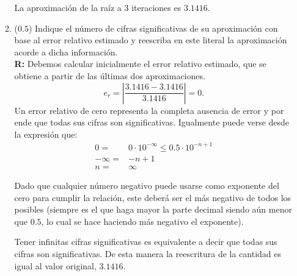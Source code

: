 \documentclass[12pt]{article}
\begin{document}
\begin{enumerate}[leftmargin=*,widest=9]
\begin{enumerate}[label=\alph*]
   La aproximación de la raíz a 3 iteraciones es \(3.1416\).

   \item (\(0.5\)) Indique el número de cifras significativas de su aproximación con base al error relativo estimado y reescriba en este literal la aproximación acorde a dicha información.\\
	 \textbf{R:} Debemos calcular inicialmente el error relativo estimado, que se obtiene a partir de las últimas dos aproximaciones.
	 \[ e_r = \left\vert \frac{3.1416 - 3.1416}{3.1416} \right\vert = 0. \]
	 Un error relativo de cero representa la completa ausencia de error y por ende que todas sus cifras son significativas.
	 Igualmente puede verse desde la expresión que:
	 \begin{eqnarray*}
	 0 = &0 \cdot 10^{-\infty} \leq 0.5 \cdot 10^{-n+1}\\
	 -\infty = &-n + 1\\
	 n = &\infty
	 \end{eqnarray*}

	 Dado que cualquier número negativo puede usarse como exponente del cero para cumplir la relación, este deberá ser el más negativo de todos los posibles (siempre es el que haga mayor la parte decimal siendo aún menor que \(0.5\), lo cual se hace haciendo más negativo el exponente).

	 Tener infinitas cifras significativas es equivalente a decir que todas sus cifras son significativas. De esta manera la reescritura de la cantidad es igual al valor original, \(3.1416\).
   \end{enumerate}

\end{enumerate}
\end{document}
